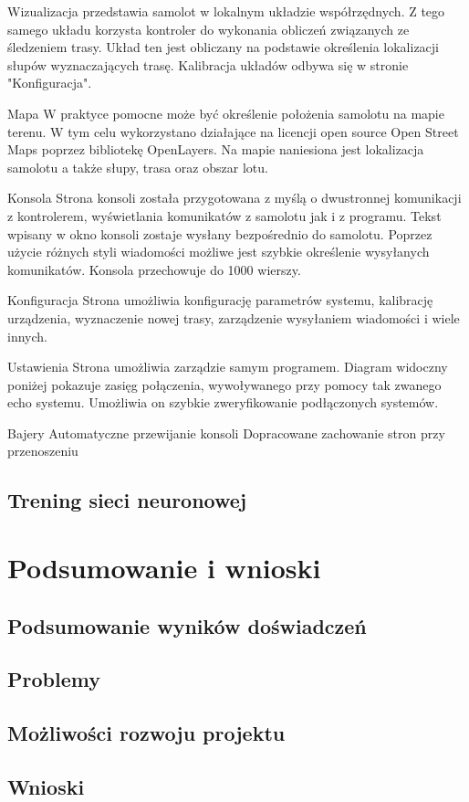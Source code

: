 \documentclass[12pt, a4paper]{article}
\begin{document}
Wizualizacja przedstawia samolot w lokalnym układzie współrzędnych. Z tego samego układu korzysta kontroler do wykonania obliczeń związanych ze śledzeniem trasy. Układ ten jest obliczany na podstawie określenia lokalizacji słupów wyznaczających trasę. Kalibracja układów odbywa się w stronie "Konfiguracja". 

Mapa
W praktyce pomocne może być określenie położenia samolotu na mapie terenu. W tym celu wykorzystano działające na licencji open source Open Street Maps poprzez bibliotekę OpenLayers. Na mapie naniesiona jest lokalizacja samolotu a także słupy, trasa oraz obszar lotu.

Konsola
Strona konsoli została przygotowana z myślą o dwustronnej komunikacji z kontrolerem, wyświetlania komunikatów z samolotu jak i z programu. Tekst wpisany w okno konsoli zostaje wysłany bezpośrednio do samolotu. Poprzez użycie różnych styli wiadomości możliwe jest szybkie określenie wysyłanych komunikatów. Konsola przechowuje do 1000 wierszy.

Konfiguracja
Strona umożliwia konfigurację parametrów systemu, kalibrację urządzenia, wyznaczenie nowej trasy, zarządzenie wysyłaniem wiadomości i wiele innych.

Ustawienia
Strona umożliwia zarządzie samym programem. Diagram widoczny poniżej pokazuje zasięg połączenia, wywoływanego przy pomocy tak zwanego echo systemu. Umożliwia on szybkie zweryfikowanie podłączonych systemów. 

Bajery
Automatyczne przewijanie konsoli
Dopracowane zachowanie stron przy przenoszeniu

\FloatBarrier
\subsection{Trening sieci neuronowej}

\section{Podsumowanie i wnioski}
\subsection{Podsumowanie wyników doświadczeń}
\subsection{Problemy}
\subsection{Możliwości rozwoju projektu}
\subsection{Wnioski}
\end{document}
